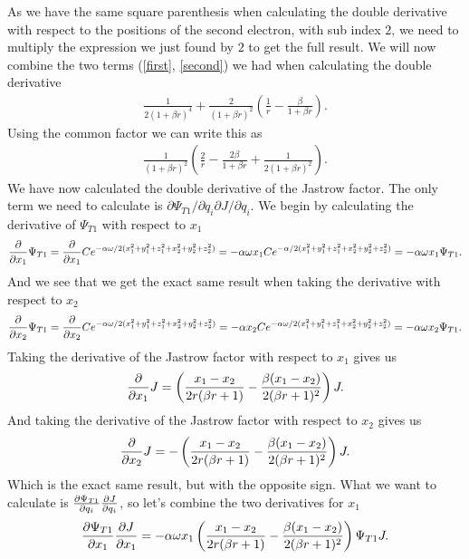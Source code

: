 \documentclass[%
 reprint,
nofootinbib,
aps,
]{revtex4-1}
\begin{document}
As we have the same square parenthesis when calculating the double derivative with respect to the positions of the second electron, with sub index $2$, we need to multiply the expression we just found by $2$ to get the full result.
We will now combine the two terms (\ref{first}, \ref{second}) we had when calculating the double derivative
\begin{gather}
  \frac{1}{2(1+\beta r)^4} + \frac{2}{(1+\beta r)^2}\left(\frac{1}{r} - \frac{\beta}{1+\beta r} \right).
\end{gather}
Using the common factor we can write this as
\begin{gather}
  \frac{1}{(1+\beta r)^2}\left(\frac{2}{r} - \frac{2\beta}{1+\beta r} + \frac{1}{2(1+\beta r)^2}  \right).
\end{gather}
We have now calculated the double derivative of the Jastrow factor. The only term we need to calculate is $\partial \Psi_{T1}/\partial q_i \partial J/ \partial q_i$. We begin by calculating the derivative of $\Psi_{T1}$ with respect to $x_1$
\begin{equation}
  \pdv{}{x_1}\Psi_{T1} = \pdv{}{x_1} C e^{-\alpha\omega/2(x_1^2 + y_1^2 + z_1^2 + x_2^2 + y_2^2 + z_2^2)} = -\alpha \omega x_1 C e^{-\alpha/2(x_1^2 + y_1^2 + z_1^2 + x_2^2 + y_2^2 + z_2^2)} = - \alpha \omega x_1 \Psi_{T1}.
\end{equation}
And we see that we get the exact same result when taking the derivative with respect to $x_2$
\begin{equation}
  \pdv{}{x_2}\Psi_{T1} = \pdv{}{x_2} C e^{-\alpha\omega/2(x_1^2 + y_1^2 + z_1^2 + x_2^2 + y_2^2 + z_2^2)} = -\alpha x_2 C e^{-\alpha\omega/2(x_1^2 + y_1^2 + z_1^2 + x_2^2 + y_2^2 + z_2^2)} = - \alpha\omega x_2 \Psi_{T1}.
\end{equation}
Taking the derivative of the Jastrow factor with respect to $x_1$ gives us
\begin{equation}
  \pdv{}{x_1}J = \left( \frac{x_1-x_2}{2r(\beta r + 1)} - \frac{\beta(x_1-x_2)}{2(\beta r + 1)^2}\right) J.
\end{equation}
And taking the derivative of the Jastrow factor with respect to $x_2$ gives us
\begin{equation}
  \pdv{}{x_2}J = -\left(\frac{x_1-x_2}{2r(\beta r + 1)} - \frac{\beta(x_1-x_2)}{2(\beta r + 1)^2}\right) J.
\end{equation}
Which is the exact same result, but with the opposite sign. What we want to calculate is $\pdv{\Psi_{T1}}{q_i}\pdv{J}{q_i}$, so let's combine the two derivatives for $x_1$
\begin{equation}
  \pdv{\Psi_{T1}}{x_1}\pdv{J}{x_1} = - \alpha\omega x_1 \left( \frac{x_1-x_2}{2r(\beta r + 1)} - \frac{\beta(x_1-x_2)}{2(\beta r + 1)^2}\right) \Psi_{T1} J.
\end{equation}
\end{document}
